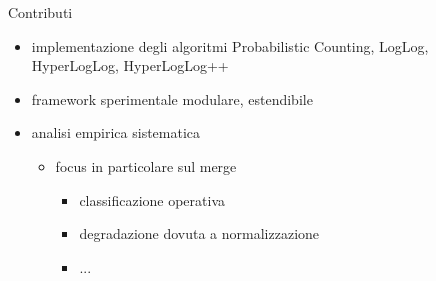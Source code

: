 \documentclass[aspectratio=169, 10pt]{beamer}
\begin{document}
  \begin{frame}{Contributi}
    \begin{itemize}
      \item implementazione degli algoritmi Probabilistic Counting, LogLog, HyperLogLog, HyperLogLog++
      \item framework sperimentale modulare, estendibile
      \item analisi empirica sistematica
      \begin{itemize}
        \item focus in particolare sul merge
        \begin{itemize}
          \item classificazione operativa
          \item \alert{degradazione} dovuta a normalizzazione
          \item ...
        \end{itemize}
      \end{itemize}
    \end{itemize}
  \end{frame}
\end{document}

